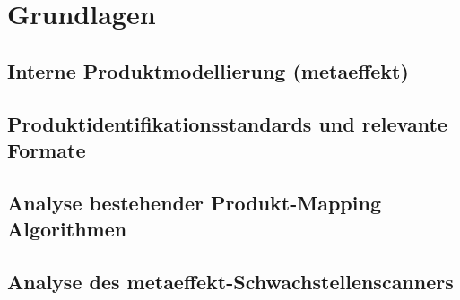 \chapter{Grundlagen}


\section{Interne Produktmodellierung (metaeffekt)}


\section{Produktidentifikationsstandards und relevante Formate}


\section{Analyse bestehender Produkt-Mapping Algorithmen}


\section{Analyse des metaeffekt-Schwachstellenscanners}
